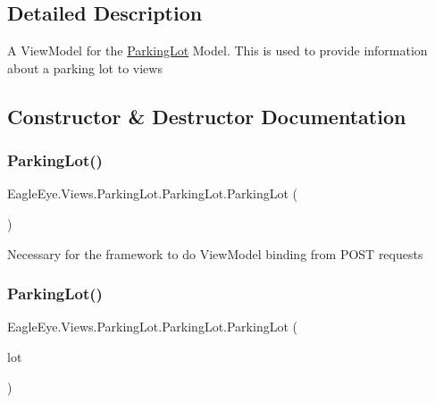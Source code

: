 \subsection{Detailed Description}
A View\+Model for the \mbox{\hyperlink{class_eagle_eye_1_1_views_1_1_parking_lot_1_1_parking_lot}{Parking\+Lot}} Model. This is used to provide information about a parking lot to views 



\subsection{Constructor \& Destructor Documentation}
\mbox{\label{class_eagle_eye_1_1_views_1_1_parking_lot_1_1_parking_lot_ab1048c32ed1b8cfa5e06f8cd9f614e03}} 
\subsubsection{\texorpdfstring{ParkingLot()}{ParkingLot()}\hspace{0.1cm}{\footnotesize\ttfamily [1/2]}}
{\footnotesize\ttfamily Eagle\+Eye.\+Views.\+Parking\+Lot.\+Parking\+Lot.\+Parking\+Lot (\begin{DoxyParamCaption}{ }\end{DoxyParamCaption})}



Necessary for the framework to do View\+Model binding from P\+O\+ST requests 

\mbox{\label{class_eagle_eye_1_1_views_1_1_parking_lot_1_1_parking_lot_a59da91cf482ad49cc2ff6ac1ea051f7f}} 
\subsubsection{\texorpdfstring{ParkingLot()}{ParkingLot()}\hspace{0.1cm}{\footnotesize\ttfamily [2/2]}}
{\footnotesize\ttfamily Eagle\+Eye.\+Views.\+Parking\+Lot.\+Parking\+Lot.\+Parking\+Lot (\begin{DoxyParamCaption}\item[{\mbox{\hyperlink{class_eagle_eye_1_1_models_1_1_parking_lot}{Models.\+Parking\+Lot}}}]{lot }\end{DoxyParamCaption})}



